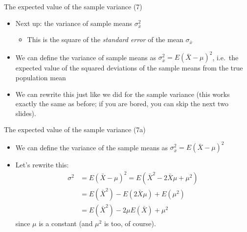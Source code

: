 \begin{frame}{The expected value of the sample variance (7)}

\begin{itemize}
\itemsep1pt\parskip0pt
\item
  Next up: the variance of sample means \(\sigma_{\bar{x}}^2\)

  \begin{itemize}
  \itemsep1pt\parskip0pt
  \item
    This is the square of the \emph{standard error} of the mean
    \(\sigma_{\bar{x}}\)
  \end{itemize}
\item
  We can define the variance of sample means as
  \(\sigma_{\bar{x}}^2 = E(\bar{X} - \mu)^2\), i.e.~the expected value
  of the squared deviations of the sample means from the true population
  mean
\item
  We can rewrite this just like we did for the sample variance (this
  works exactly the same as before; if you are bored, you can skip the
  next two slides).
\end{itemize}

\end{frame}

\begin{frame}{The expected value of the sample variance (7a)}

\begin{itemize}
\itemsep1pt\parskip0pt
\item
  We can define the variance of the sample means as
  \(\sigma_{\bar{x}}^2 = E(\bar{X} - \mu)^2\)
\item
  Let's rewrite this: \[
  \begin{aligned}
  \sigma^2 &= E(\bar{X} - \mu)^2 = E(\bar{X}^2 - 2\bar{X}\mu + \mu^2) \\
       &= E(\bar{X}^2) - E(2\bar{X}\mu) + E(\mu^2)\\
       &= E(\bar{X}^2) - 2\mu E(\bar{X}) + \mu^2
  \end{aligned}
  \] since \(\mu\) is a constant (and \(\mu^2\) is too, of course).
\end{itemize}

\end{frame}

